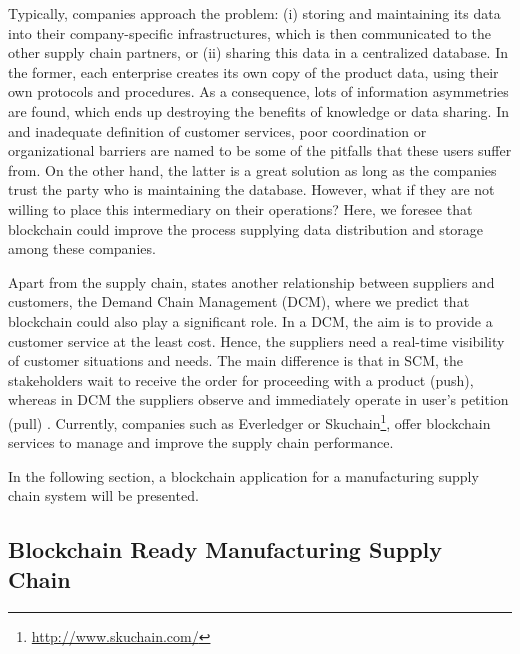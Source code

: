 Typically, companies approach the problem: (i) storing and maintaining its data into their company-specific infrastructures, which is then communicated to the other supply chain partners, or (ii) sharing this data in a centralized database. In the former, each enterprise creates its own copy of the product data, using their own protocols and procedures.  As a consequence, lots of information asymmetries are found, which ends up destroying the benefits of knowledge or data sharing. In \citep{lee1992managing} and \citep{fiala2005information} inadequate definition of customer services, poor coordination or organizational barriers are named to be some of the pitfalls that these users suffer from. On the other hand, the latter is a great solution as long as the companies trust the party who is maintaining the database. However, what if they are not willing to place this intermediary on their operations? Here, we foresee that blockchain could improve the process supplying data distribution and storage among these companies.

Apart from the supply chain, \citep{heikkila2002supply} states another relationship between suppliers and customers, the Demand Chain Management (DCM), where we predict that blockchain could also play a significant role. In a DCM, the aim is to provide a customer service at the least cost. Hence, the suppliers need a real-time visibility of customer situations and needs. The main difference is that in SCM, the stakeholders wait to receive the order for proceeding with a product (push), whereas in DCM the suppliers observe and immediately operate in user's petition (pull) \citep{wust2017you}. Currently, companies such as Everledger or Skuchain\footnote{\url{http://www.skuchain.com/}}, offer blockchain services to manage and improve the supply chain performance.
 
In the following section, a blockchain application for a manufacturing supply chain system will be presented.

\subsection{Blockchain Ready Manufacturing Supply Chain} \label{manufacturing}

